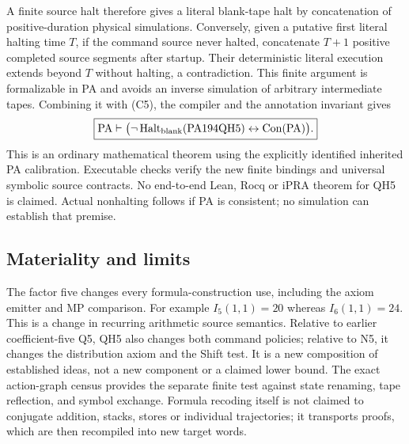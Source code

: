 A finite source halt therefore gives a literal blank-tape halt by
concatenation of positive-duration physical simulations. Conversely,
given a putative first literal halting time $T$, if the command source
never halted, concatenate $T+1$ positive completed source segments after
startup. Their deterministic literal execution extends beyond $T$
without halting, a contradiction. This finite argument is formalizable
in PA and avoids an inverse simulation of arbitrary intermediate tapes.
Combining it with (C5), the compiler and the annotation invariant gives
\[
 \boxed{\mathrm{PA}\vdash
 \bigl(\neg\operatorname{Halt}_{\rm blank}(\mathrm{PA194QH5})
                  \leftrightarrow\operatorname{Con}(\mathrm{PA})\bigr).}
\]
This is an ordinary mathematical theorem using the explicitly identified
inherited PA calibration. Executable checks verify the new finite
bindings and universal symbolic source contracts. No end-to-end Lean,
Rocq or iPRA theorem for QH5 is claimed. Actual nonhalting follows if PA
is consistent; no simulation can establish that premise.

\subsection{Materiality and limits}

The factor five changes every formula-construction use, including the
axiom emitter and MP comparison. For example $I_5(1,1)=20$ whereas
$I_6(1,1)=24$. This is a change in recurring arithmetic source semantics.
Relative to earlier coefficient-five Q5, QH5 also changes both command
policies; relative to N5, it changes the distribution axiom and the Shift
test. It is a new composition of established ideas, not a new component
or a claimed lower bound. The exact action-graph census provides the
separate finite test against state renaming, tape reflection, and symbol
exchange. Formula recoding itself is not claimed to conjugate addition,
stacks, stores or individual trajectories; it transports proofs, which
are then recompiled into new target words.
